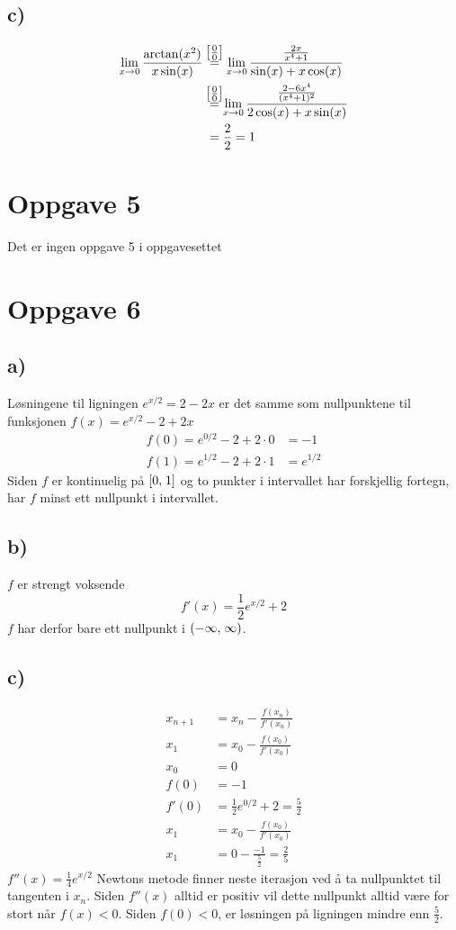 \documentclass{article}
\begin{document}
\subsection*{c)}
\begin{align*}
	\lim_{x\to 0} \frac{\arctan(x^2)}{x\sin(x)} \;&\nillnill\; \lim_{x\to 0} \frac{\frac{2x}{x^4+1}}{\sin(x) + x\cos(x)}\\
	&\nillnill 	\lim_{x\to 0} \frac{\frac{2-6x^4}{(x^4+1)^2}}{2\cos(x) + x\sin(x)}\\
	&= \frac{2}{2} = 1
\end{align*}
\section*{Oppgave 5}
Det er ingen oppgave 5 i oppgavesettet
\section*{Oppgave 6}
\subsection*{a)}
Løsningene til ligningen $e^{x/2} = 2-2x$ er det samme som nullpunktene til funksjonen $f(x) = e^{x/2} - 2+2x$
\begin{align*}
	f(0) = e^{0/2} - 2 + 2\cdot 0 &= -1\\
	f(1) = e^{1/2} - 2 + 2 \cdot 1 &= e^{1/2}
\end{align*}
Siden $f$ er kontinuelig på $\interval[{0,\;1}]$ og to punkter i intervallet har forskjellig fortegn, har $f$ minst ett nullpunkt i intervallet.
\subsection*{b)}
$f$ er strengt voksende $$f'(x) = \frac{1}{2} e^{x/2} + 2$$
$f$ har derfor bare ett nullpunkt i $\interval({-\infty,\;\infty})$.
\subsection*{c)}
\begin{align*}
	x_{n+1} &= x_n - \frac{f(x_n)}{f'(x_n)}\\
	x_1 &= x_0 - \frac{f(x_0)}{f'(x_0)}\\
	x_0 &= 0\\
	f(0) &= -1\\
	f'(0) &= \frac{1}{2} e^{0/2} + 2 = \frac{5}{2}\\
	x_1 &= x_0 - \frac{f(x_0)}{f'(x_0)}\\
	x_1 &= 0 - \frac{-1}{\frac{5}{2}} = \frac{2}{5}
\end{align*}
$f''(x) = \frac{1}{4} e^{x/2}$
\skippingparagraph
Newtons metode finner neste iterasjon ved å ta nullpunktet til tangenten i $x_n$. Siden $f''(x)$ alltid er positiv vil dette nullpunkt alltid være for stort når $f(x) < 0$. Siden $f(0) < 0$, er løsningen på ligningen mindre enn $\frac{5}{2}$.
\end{document}
